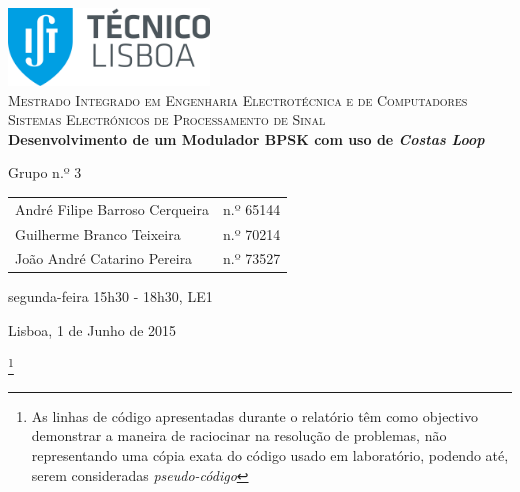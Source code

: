 \documentclass[11pt]{article}
\numberwithin{equation}{section}
\begin{document}
\begin{titlepage}
	\begin{center}
		
		\hfill \break
		\hfill \break
		
		\includegraphics[width=0.4\textwidth]{./logo}~\\[1cm]
		
		\textsc{\Large Mestrado Integrado em Engenharia Electrotécnica e de Computadores}\\[1.5cm]
		\textsc{\huge Sistemas Electrónicos de Processamento de Sinal}\\[0.4cm]
		
		{\huge \bfseries Desenvolvimento de um Modulador BPSK com uso de \textit{Costas Loop} \\[1.2cm]}
		
		Grupo n.º 3 \vspace{0.3cm}
		
		\begin{tabular}{l r}
			André Filipe Barroso Cerqueira \hspace{1mm} & n.º 65144 \\
			Guilherme Branco Teixeira \hspace{1mm} & n.º 70214  \\
			João André Catarino Pereira & n.º 73527
		\end{tabular}
		
		\hfill
		\hfill
		
		segunda-feira 15h30 - 18h30, LE1
		
	
		\vfill
		
		{\large Lisboa, 1 de Junho de 2015} 
		
	\end{center}
\end{titlepage}
\clearpage

	\footnote{As linhas de código apresentadas durante o relatório têm como objectivo demonstrar a maneira de raciocinar na resolução de problemas, não representando uma cópia exata do código usado em laboratório, podendo até, serem consideradas \textit{pseudo-código}}
	
\tableofcontents
\pagebreak

\clearpage
{}
\end{document}
